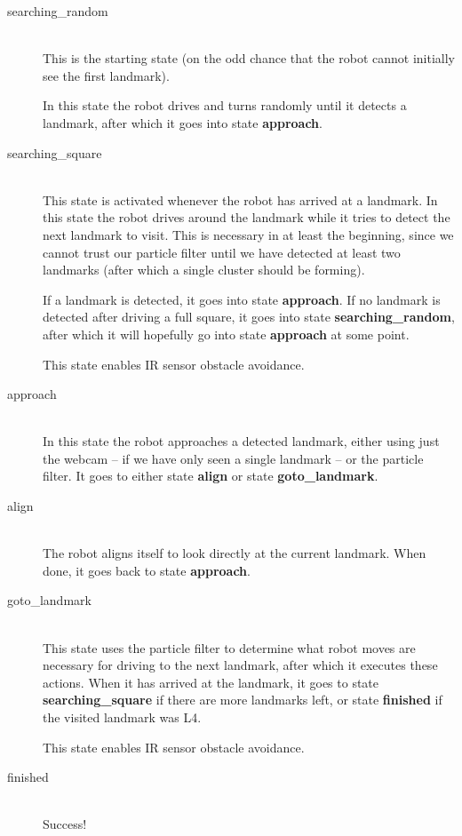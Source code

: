 \documentclass[a4paper,12pt]{article}
\begin{document}
\begin{description}
\item[searching_random]\hfill\\
This is the starting state (on the odd chance that the robot cannot initially
see the first landmark).

In this state the robot drives and turns randomly until it detects a landmark,
after which it goes into state \textbf{approach}.


\item[searching_square]\hfill\\
This state is activated whenever the robot has arrived at a landmark.  In this
state the robot drives around the landmark while it tries to detect the next
landmark to visit.  This is necessary in at least the beginning, since we cannot
trust our particle filter until we have detected at least two landmarks (after
which a single cluster should be forming).

If a landmark is detected, it goes into state \textbf{approach}.  If no landmark
is detected after driving a full square, it goes into state
\textbf{searching_random}, after which it will hopefully go into state
\textbf{approach} at some point.

This state enables IR sensor obstacle avoidance.


\item[approach]\hfill\\
In this state the robot approaches a detected landmark, either using just the
webcam -- if we have only seen a single landmark -- or the particle filter.  It
goes to either state \textbf{align} or state \textbf{goto_landmark}.


\item[align]\hfill\\
The robot aligns itself to look directly at the current landmark.  When done, it
goes back to state \textbf{approach}.


\item[goto_landmark]\hfill\\
This state uses the particle filter to determine what robot moves are necessary
for driving to the next landmark, after which it executes these actions.  When
it has arrived at the landmark, it goes to state \textbf{searching_square} if
there are more landmarks left, or state \textbf{finished} if the visited
landmark was L4.

This state enables IR sensor obstacle avoidance.


\item[finished]\hfill\\
Success!

\end{description}
\end{document}
